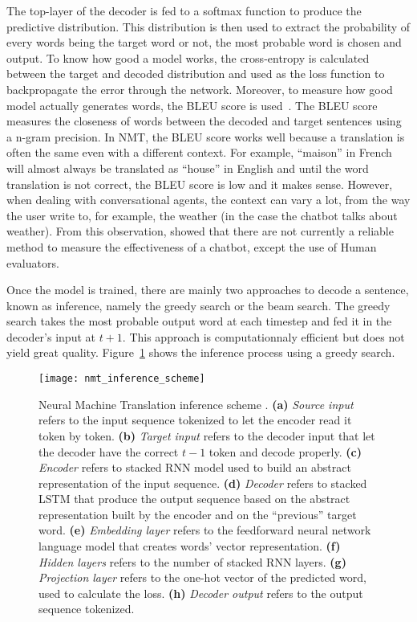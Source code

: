 The top-layer of the decoder is fed to a softmax function to produce the predictive distribution. This distribution is then used to extract the probability of every words being the target word or not, the most probable word is chosen and output. To know how good a model works, the cross-entropy is calculated between the target and decoded distribution and used as the loss function to backpropagate the error through the network.
Moreover, to measure how good model actually generates words, the BLEU score is used~\citep{bleu-score}. The BLEU score measures the closeness of words between the decoded and target sentences using a n-gram precision.
In NMT, the BLEU score works well because a translation is often the same even with a different context. For example, ``maison'' in French will almost always be translated as ``house'' in English and until the word translation is not correct, the BLEU score is low and it makes sense.
However, when dealing with conversational agents, the context can vary a lot, from the way the user write to, for example, the weather (in the case the chatbot talks about weather). From this observation, \citet{1603.08023} showed that there are not currently a reliable method to measure the effectiveness of a chatbot, except the use of Human evaluators.

Once the model is trained, there are mainly two approaches to decode a sentence, known as inference, namely the greedy search or the beam search. The greedy search takes the most probable output word at each timestep and fed it in the decoder's input at $t+1$. This approach is computationnaly efficient but does not yield great quality. Figure~\ref{fig:nmt-inference} shows the inference process using a greedy search.
\begin{figure}
    \centering
    \texttt{[image: nmt\_inference\_scheme]}
    \caption[Neural Machine Translation inference scheme]{Neural Machine Translation inference scheme \citep{tensorflow.nmt}. \textbf{(a)} \textit{Source input} refers to the input sequence tokenized to let the encoder read it token by token. \textbf{(b)} \textit{Target input} refers to the decoder input that let the decoder have the correct $t-1$ token and decode properly. \textbf{(c)} \textit{Encoder} refers to stacked RNN model used to build an abstract representation of the input sequence. \textbf{(d)} \textit{Decoder} refers to stacked LSTM that produce the output sequence based on the abstract representation built by the encoder and on the ``previous'' target word. \textbf{(e)} \textit{Embedding layer} refers to the feedforward neural network language model that creates words' vector representation. \textbf{(f)} \textit{Hidden layers} refers to the number of stacked RNN layers. \textbf{(g)} \textit{Projection layer} refers to the one-hot vector of the predicted word, used to calculate the loss. \textbf{(h)} \textit{Decoder output} refers to the output sequence tokenized.}
    \label{fig:nmt-inference}
\end{figure}


